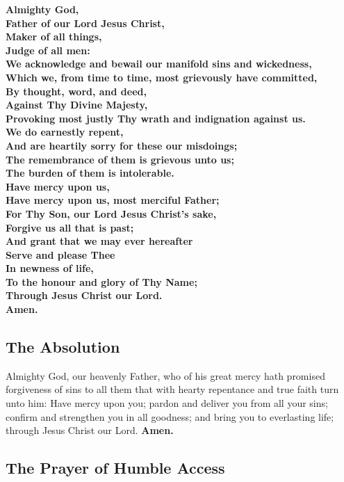 \textbf{Almighty God,\\
Father of our Lord Jesus Christ,\\
Maker of all things,\\
Judge of all men:\\
We acknowledge and bewail our manifold sins and wickedness,\\
Which we, from time to time, most grievously have committed,\\
By thought, word, and deed,\\
Against Thy Divine Majesty,\\
Provoking most justly Thy wrath and indignation against us.\\
We do earnestly repent,\\
And are heartily sorry for these our misdoings;\\
The remembrance of them is grievous unto us;\\
The burden of them is intolerable.\\
Have mercy upon us,\\
Have mercy upon us, most merciful Father;\\
For Thy Son, our Lord Jesus Christ's sake,\\
Forgive us all that is past;\\
And grant that we may ever hereafter\\
Serve and please Thee\\
In newness of life,\\
To the honour and glory of Thy Name;\\
Through Jesus Christ our Lord.\\
Amen.}

\newpage

\subsection{The Absolution}

Almighty God, our heavenly Father, who of his great mercy hath promised
forgiveness of sins to all them that with hearty repentance and true faith turn
unto him: Have mercy upon you; \cross pardon and deliver you from all your sins;
confirm and strengthen you in all goodness; and bring you to everlasting life;
through Jesus Christ our Lord. \textbf{Amen.}

\subsection{The Prayer of Humble Access}

